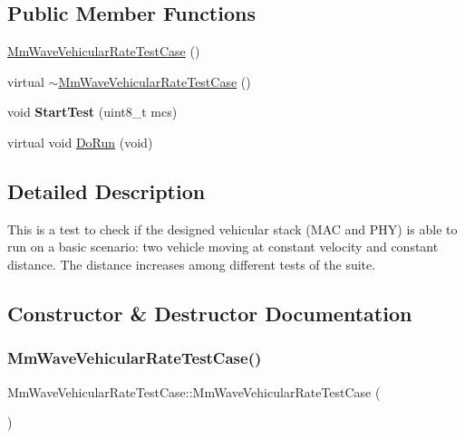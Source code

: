 \subsection*{Public Member Functions}
\begin{DoxyCompactItemize}
\item 
\hyperlink{classMmWaveVehicularRateTestCase_a3e2b124bb19443c51bbb945164783fc9}{Mm\+Wave\+Vehicular\+Rate\+Test\+Case} ()
\item 
virtual \hyperlink{classMmWaveVehicularRateTestCase_a83287f6a2eb13810a640a6b0afe4488e}{$\sim$\+Mm\+Wave\+Vehicular\+Rate\+Test\+Case} ()
\item 
\mbox{\label{classMmWaveVehicularRateTestCase_a8e2c0002d701bc8f83913b60108d2f45}} 
void {\bfseries Start\+Test} (uint8\+\_\+t mcs)
\item 
virtual void \hyperlink{classMmWaveVehicularRateTestCase_aa22f2f029bf2ebad00c01d80e9e93e58}{Do\+Run} (void)
\end{DoxyCompactItemize}


\subsection{Detailed Description}
This is a test to check if the designed vehicular stack (M\+AC and P\+HY) is able to run on a basic scenario\+: two vehicle moving at constant velocity and constant distance. The distance increases among different tests of the suite. 

\subsection{Constructor \& Destructor Documentation}
\mbox{\label{classMmWaveVehicularRateTestCase_a3e2b124bb19443c51bbb945164783fc9}} 
\subsubsection{\texorpdfstring{Mm\+Wave\+Vehicular\+Rate\+Test\+Case()}{MmWaveVehicularRateTestCase()}}
{\footnotesize\ttfamily Mm\+Wave\+Vehicular\+Rate\+Test\+Case\+::\+Mm\+Wave\+Vehicular\+Rate\+Test\+Case (\begin{DoxyParamCaption}{ }\end{DoxyParamCaption})}

